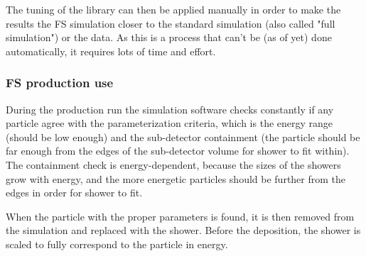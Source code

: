 The tuning of the library can then be applied manually in order to make the results the FS simulation closer to the standard simulation (also called "full simulation") or the data. As this is a process that can't be (as of yet) done automatically, it requires lots of time and effort.

\subsubsection{FS production use}
\label{sec:MC_FS_prod}

During the production run the simulation software checks constantly if any particle agree with the parameterization criteria, which is the energy range (should be low enough) and the sub-detector containment (the particle should be far enough from the edges of the sub-detector volume for shower to fit within). The containment check is energy-dependent, because the sizes of the showers grow with energy, and the more energetic particles should be further from the edges in order for shower to fit.

When the particle with the proper parameters is found, it is then removed from the simulation and replaced with the shower. Before the deposition, the shower is scaled to fully correspond to the particle in energy.

\begin{figure}
\end{figure}

